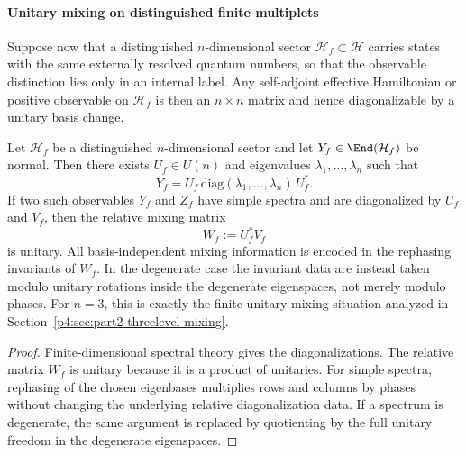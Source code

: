 \documentclass[12pt,a4paper]{article}
\begin{document}
\paragraph{Unitary mixing on distinguished finite multiplets}
\label{p4:sec:part2-unitary-mixing-multiplets}

Suppose now that a distinguished \(n\)-dimensional sector \(\mathcal H_f\subset\mathcal H\)
carries states with the same externally resolved quantum numbers, so that the observable distinction lies only in an internal label.
Any self-adjoint effective Hamiltonian or positive observable on \(\mathcal H_f\) is then an \(n\times n\) matrix and hence diagonalizable by a unitary basis change.

\begin{theorem}
\label{p4:thm:finite-multiplet-mixing}
Let \(\mathcal H_f\) be a distinguished \(n\)-dimensional sector and let
\(Y_f\in\End(\mathcal H_f)\) be normal.  Then there exists \(U_f\in U(n)\) and
eigenvalues \(\lambda_1,\dots,\lambda_n\) such that
\begin{equation}
\label{p4:eq:multiplet-diagonalization}
Y_f = U_f \,\mathrm{diag}(\lambda_1,\dots,\lambda_n)\, U_f^*.
\end{equation}
If two such observables \(Y_f\) and \(Z_f\) have simple spectra and are
diagonalized by \(U_f\) and \(V_f\), then the relative mixing matrix
\begin{equation}
\label{p4:eq:relative-multiplet-mixing}
W_f := U_f^*V_f
\end{equation}
is unitary.  All basis-independent mixing information is encoded in the
rephasing invariants of \(W_f\).  In the degenerate case the invariant data are
instead taken modulo unitary rotations inside the degenerate eigenspaces, not
merely modulo phases.  For \(n=3\), this is exactly the finite unitary mixing
situation analyzed in Section~\ref{p4:sec:part2-threelevel-mixing}.
\end{theorem}

\begin{proof}
Finite-dimensional spectral theory gives the diagonalizations.
The relative matrix \(W_f\) is unitary because it is a product of unitaries.
For simple spectra, rephasing of the chosen eigenbases multiplies rows and columns by phases without changing the underlying relative diagonalization data.  If a spectrum is degenerate, the same argument is replaced by quotienting by the full unitary freedom in the degenerate eigenspaces.
\end{proof}
\end{document}
